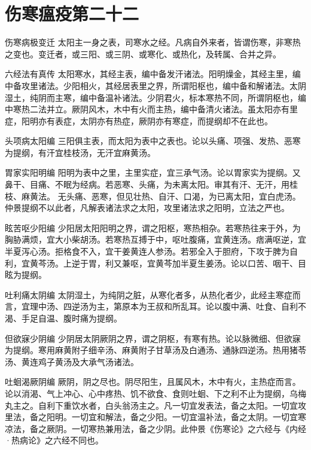\documentclass[a4paper,12pt,UTF8,twoside]{ctexbook}
\begin{document}
    
    
    \chapter{伤寒瘟疫第二十二}
   	
    
    伤寒病极变迁
    太阳主一身之表，司寒水之经。凡病自外来者，皆谓伤寒，非寒热之变也。变迁者，或三阳、或三阴、或寒化、或热化，及转属、合并之异。
    
    六经法有真传
    太阳寒水，其经主表，编中备发汗诸法。阳明燥金，其经主里，编中备攻里诸法。少阳相火，其经居表里之界，所谓阳枢也，编中备和解诸法。太阴湿土，纯阴而主寒，编中备温补诸法。少阴君火，标本寒热不同，所谓阴枢也，编中寒热二法并立。厥阴风木，木中有火而主热，编中备清火诸法。虽太阳亦有里症，阳明亦有表症，太阴亦有热症，厥阴亦有寒症，而提纲却不在此也。
    
    头项病太阳编
    三阳俱主表，而太阳为表中之表也。论以头痛、项强、发热、恶寒为提纲，有汗宜桂枝汤，无汗宜麻黄汤。
    
    胃家实阳明编
    阳明为表中之里，主里实症，宜三承气汤。论以胃家实为提纲。又鼻干、目痛、不眠为经病。若恶寒、头痛，为未离太阳。审其有汗、无汗，用桂枝、麻黄法。
    无头痛、恶寒，但见壮热、自汗、口渴，为已离太阳，宜白虎汤。仲景提纲不以此者，凡解表诸法求之太阳，攻里诸法求之阳明，立法之严也。
    
    眩苦呕少阳编
    少阳居太阳阳明之界，谓之阳枢，寒热相杂。若寒热往来于外，为胸胁满烦，宜大小柴胡汤。若寒热互搏于中，呕吐腹痛，宜黄连汤。痞满呕逆，宜半夏泻心汤。拒格食不入，宜干姜黄连人参汤。若邪全入于胆府，下攻于脾为自利，宜黄芩汤。上逆于胃，利又兼呕，宜黄芩加半夏生姜汤。论以口苦、咽干、目眩为提纲。
    
    吐利痛太阴编
    太阴湿土，为纯阴之脏，从寒化者多，从热化者少，此经主寒症而言，宜理中汤、四逆汤为主，第原本为王叔和所乱耳。论以腹中满、吐食、自利不渴、手足自温、腹时痛为提纲。
    
    但欲寐少阴编
    少阴居太阴厥阴之界，谓之阴枢，有寒有热。论以脉微细、但欲寐为提纲。寒用麻黄附子细辛汤、麻黄附子甘草汤及白通汤、通脉四逆汤。热用猪苓汤、黄连鸡子黄汤及大承气汤诸法。
    
    吐蛔渴厥阴编
    厥阴，阴之尽也。阴尽阳生，且属风木，木中有火，主热症而言。论以消渴、气上冲心、心中疼热、饥不欲食、食则吐蛔、下之利不止为提纲，乌梅丸主之。自利下重饮水者，白头翁汤主之。凡一切宜发表法，备之太阳。一切宜攻里法，备之阳明。一切宜和解法，备之少阳。一切宜温补法，备之太阴。一切宜寒凉法，备之厥阴。一切寒热兼用法，备之少阴。此仲景《伤寒论》之六经与《内经·热病论》之六经不同也。
    
\end{document}
